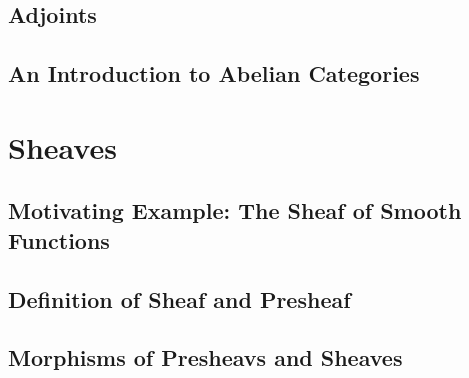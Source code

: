 \documentclass[openany]{book}
\begin{document}
\section{Adjoints}

\section{An Introduction to Abelian Categories}



\chapter{Sheaves}

\section{Motivating Example: The Sheaf of Smooth Functions}



\section{Definition of Sheaf and Presheaf}



\section{Morphisms of Presheavs and Sheaves}


\end{document}
